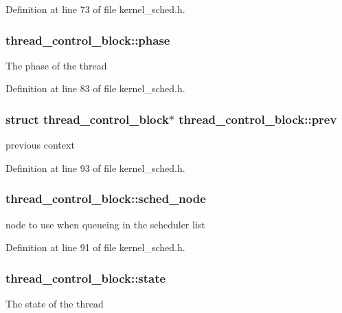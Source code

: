 Definition at line 73 of file kernel\-\_\-sched.\-h.

\hypertarget{structthread__control__block_aa7e8e6a00c5f9f25210a49589ad818f8}{
\subsubsection[{phase}]{ thread\-\_\-control\-\_\-block\-::phase}}\label{structthread__control__block_aa7e8e6a00c5f9f25210a49589ad818f8}
The phase of the thread 

Definition at line 83 of file kernel\-\_\-sched.\-h.

\hypertarget{structthread__control__block_a605a6e9bb8154b658ee72e193599d180}{
\subsubsection[{prev}]{\setlength{\rightskip}{0pt plus 5cm}struct {\bf thread\-\_\-control\-\_\-block}$\ast$ thread\-\_\-control\-\_\-block\-::prev}}\label{structthread__control__block_a605a6e9bb8154b658ee72e193599d180}
previous context 

Definition at line 93 of file kernel\-\_\-sched.\-h.

\hypertarget{structthread__control__block_add433b079e04053fe70fdd2b92e1d6ad}{
\subsubsection[{sched\-\_\-node}]{ thread\-\_\-control\-\_\-block\-::sched\-\_\-node}}\label{structthread__control__block_add433b079e04053fe70fdd2b92e1d6ad}
node to use when queueing in the scheduler list 

Definition at line 91 of file kernel\-\_\-sched.\-h.

\hypertarget{structthread__control__block_affd872365cf4768fa1c9bd1e196bb97c}{
\subsubsection[{state}]{ thread\-\_\-control\-\_\-block\-::state}}\label{structthread__control__block_affd872365cf4768fa1c9bd1e196bb97c}
The state of the thread 

